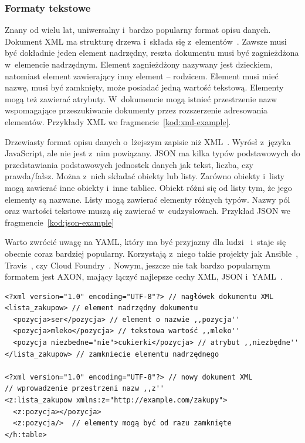 \subsubsection{Formaty tekstowe}

\begin{description}
Znany od wielu lat, uniwersalny i~bardzo popularny format opisu danych. Dokument XML ma strukturę drzewa i~składa się z~elementów~\cite{xml-tutorial}. Zawsze musi być dokładnie jeden element nadrzędny, reszta dokumentu musi być zagnieżdżona w~elemencie nadrzędnym. Element zagnieżdżony nazywany jest dzieckiem, natomiast element zawierający inny element -- rodzicem. Element musi mieć nazwę, musi być zamknięty, może posiadać jedną wartość tekstową. Elementy mogą też zawierać atrybuty. W~dokumencie mogą istnieć przestrzenie nazw wspomagające przeszukiwanie dokumenty przez rozszerzenie adresowania elementów. Przykłady XML we fragmencie~\ref{kod:xml-example}.

Drzewiasty format opisu danych o~lżejszym zapisie niż XML~\cite{json-tutorial}. Wyrósł z~języka JavaScript, ale nie jest z~nim powiązany. JSON ma kilka typów podstawowych do przedstawiania podstawowych jednostek danych jak tekst, liczba, czy prawda/fałsz. Można z~nich składać obiekty lub listy. Zarówno obiekty i~listy mogą zawierać inne obiekty i~inne tablice. Obiekt różni się od listy tym, że jego elementy są nazwane. Listy mogą zawierać elementy różnych typów. Nazwy pól oraz wartości tekstowe muszą się zawierać w~cudzysłowach. Przykład JSON we fragmencie~\ref{kod:json-example}

Warto zwrócić uwagę na YAML, który ma być przyjazny dla ludzi~\cite{yaml-spec} i~staje się obecnie coraz bardziej popularny. Korzystają z~niego takie projekty jak Ansible~\cite{ansible-yaml}, Travis~\cite{travis-configuration}, czy Cloud Foundry~\cite{cloud-foundry-config}. 
Nowym, jeszcze nie tak bardzo popularnym formatem jest AXON, mający łączyć najlepsze cechy XML, JSON i~YAML~\cite{axon-better-json}\cite{axon-best}.

\end{description}

\begin{lstlisting}[float, frame=single, caption={Przykłady XML. Komentarze poprzedzone przez ,,//'', mimo, że składnia komentarzy w~XML jest inna.}, label=kod:xml-example]
<?xml version="1.0" encoding="UTF-8"?> // nagłówek dokumentu XML
<lista_zakupow> // element nadrzędny dokumentu
  <pozycja>ser</pozycja> // element o nazwie ,,pozycja''
  <pozycja>mleko</pozycja> // tekstowa wartość ,,mleko''
  <pozycja niezbedne="nie">cukierki</pozycja> // atrybut ,,niezbędne''
</lista_zakupow> // zamkniecie elementu nadrzędnego

<?xml version="1.0" encoding="UTF-8"?> // nowy dokument XML
// wprowadzenie przestrzeni nazw ,,z''
<z:lista_zakupow xmlns:z="http://example.com/zakupy">
  <z:pozycja></pozycja>
  <z:pozycja/>  // elementy mogą być od razu zamknięte
</h:table>
\end{lstlisting}

